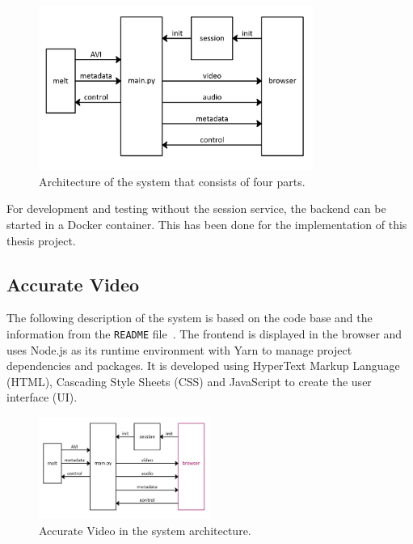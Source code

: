 \documentclass[../MasterThesis.tex]{subfiles}
\begin{document}
\begin{figure}[H]
	\centering
	\includegraphics[width=0.8\textwidth]{IM3.png}
	\caption[Architecture of the system that consists of four parts.]{Architecture of the system that consists of four parts.}
	\label{figure:SA}
\end{figure}


For development and testing without the session service, the backend can be started in a Docker container. This has been done for the implementation of this thesis project.







\subsection{Accurate Video} \label{subsection:accuratevideo}

The following description of the system is based on the code base and the information from the \texttt{README} file~\cite{RM_Frontend}.
%
The frontend is displayed in the browser and uses Node.js as its runtime environment with Yarn to manage project dependencies and packages. It is developed using HyperText Markup Language (HTML), Cascading Style Sheets (CSS) and JavaScript to create the user interface (UI).


\begin{figure}[H]
	\centering
	\includegraphics[width=0.5\textwidth]{IM_FE.png}
	\caption{Accurate Video in the system architecture.}
	\label{figure:AS_frontend}
\end{figure}
\end{document}
